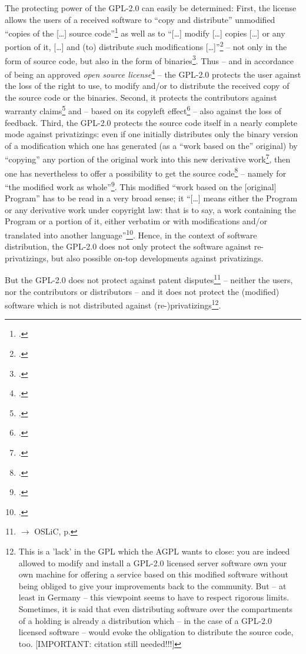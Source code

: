 The protecting power of the GPL-2.0 can easily be determined: First, the license
allows the users of a received software to \enquote{copy and distribute}
unmodified \enquote{copies of the [\ldots] source code}\footcite[cf.][\nopage
wp. §1]{Gpl20OsiLicense1991a} as well as to \enquote{[\ldots] modify [\ldots]
copies [\ldots] or any portion of it, [\ldots] and (to) distribute such
modifications [\ldots]}\footcite[cf.][\nopage wp. §2]{Gpl20OsiLicense1991a} --
not only in the form of source code, but also in the form of
binaries\footcite[cf.][\nopage wp. §3]{Gpl20OsiLicense1991a}. Thus -- and in
accordance of being an approved \emph{open source license}\footcite[cf.][\nopage
wp]{OSI2012b} -- the GPL-2.0 protects the user against the loss of the right to
use, to modify and/or to distribute the received copy of the source code or the
binaries. Second, it protects the contributors against warranty
claims\footcite[cf.][\nopage wp. §11, §12]{Gpl20OsiLicense1991a} and -- based on
its copyleft effect\footcite[cf.][\nopage wp. §3]{Gpl20OsiLicense1991a} -- also against the
loss of feedback. Third, the GPL-2.0 protects the source code itself in a nearly
complete mode against privatizings: even if one initially distributes only the
binary version of a modification which one has generated (as a \enquote{work
based on the} original) by \enquote{copying} any {portion} of the original work
into this new derivative work\footcite[cf.][\nopage wp.
§2]{Gpl20OsiLicense1991a}, then one has nevertheless to offer a possibility to
get the source code\footcite[cf.][\nopage wp. §4]{Gpl20OsiLicense1991a} --
namely for \enquote{the modified work as whole}\footcite[cf.][\nopage wp.
§3]{Gpl20OsiLicense1991a}. This modified \enquote{work based on the [original]
Program} has to be read in a very broad sense; it \enquote{[\ldots] means either
the Program or any derivative work under copyright law: that is to say, a work
containing the Program or a portion of it, either verbatim or with modifications
and/or translated into another language}\footcite[cf.][\nopage wp.
§0]{Gpl20OsiLicense1991a}. Hence, in the context of software distribution, the
GPL-2.0 does not only protect the software against re-privatizings, but also
possible on-top developments against privatizings.

But the GPL-2.0 does not protect against patent disputes\footnote{$\rightarrow$
OSLiC, p. \pageref{subsec:Gpl20PatentClause}} -- neither the users, nor the
contributors or distributors -- and it does not protect the (modified) software
which is not distributed against (re-)privatizings\footnote{This is a 'lack' in
the GPL which the AGPL wants to close: you are indeed allowed to modify and
install a GPL-2.0 licensed server software own your own machine for offering a
service based on this modified software without being obliged to give your
improvements back to the community. But -- at least in Germany -- this viewpoint
seems to have to respect rigorous limits. Sometimes, it is said that even
distributing software over the compartments of a holding is already a
distribution which -- in the case of a GPL-2.0 licensed software -- would evoke
the obligation to distribute the source code, too. [IMPORTANT: citation still
needed!!!]}.


